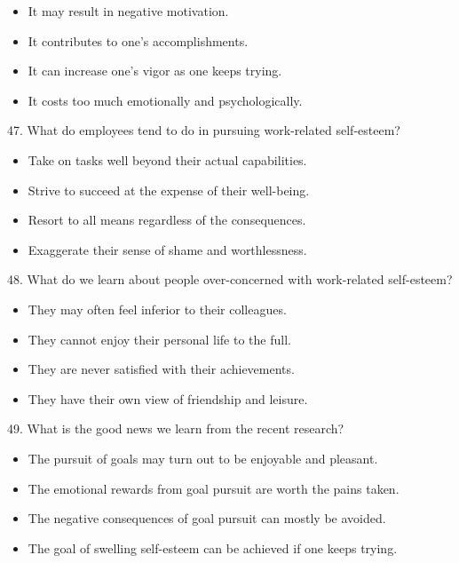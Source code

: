 \documentclass[UTF8,11pt]{ctexart}
\begin{document}
\begin{itemize}[leftmargin=2em,itemsep=.2em,topsep=.4em]\item[A.] It may result in negative motivation.
\item[B.] It contributes to one’s accomplishments.
\item[C.] It can increase one’s vigor as one keeps trying.
\item[D.] It costs too much emotionally and psychologically.
\end{itemize}

47. What do employees tend to do in pursuing work-related self-esteem?


\begin{itemize}[leftmargin=2em,itemsep=.2em,topsep=.4em]\item[A.] Take on tasks well beyond their actual capabilities.
\item[B.] Strive to succeed at the expense of their well-being.
\item[C.] Resort to all means regardless of the consequences.
\item[D.] Exaggerate their sense of shame and worthlessness.
\end{itemize}

48. What do we learn about people over-concerned with work-related self-esteem?


\begin{itemize}[leftmargin=2em,itemsep=.2em,topsep=.4em]\item[A.] They may often feel inferior to their colleagues.
\item[B.] They cannot enjoy their personal life to the full.
\item[C.] They are never satisfied with their achievements.
\item[D.] They have their own view of friendship and leisure.
\end{itemize}

49. What is the good news we learn from the recent research?


\begin{itemize}[leftmargin=2em,itemsep=.2em,topsep=.4em]\item[A.] The pursuit of goals may turn out to be enjoyable and pleasant.
\item[B.] The emotional rewards from goal pursuit are worth the pains taken.
\item[C.] The negative consequences of goal pursuit can mostly be avoided.
\item[D.] The goal of swelling self-esteem can be achieved if one keeps trying.
\end{itemize}
\end{document}
